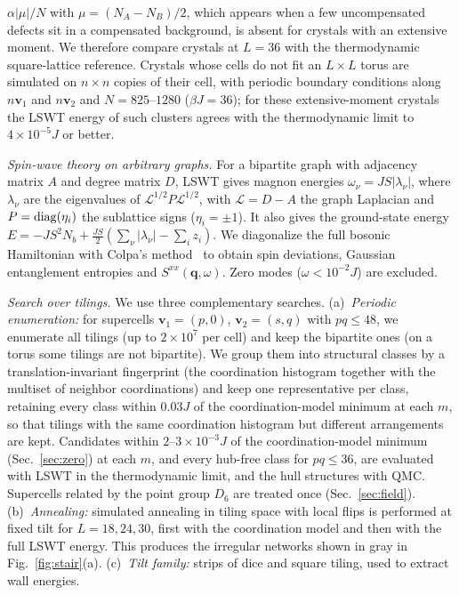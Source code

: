 \documentclass[prb,twocolumn,amsmath,amssymb,floatfix]{revtex4-2}
\begin{document}
$\alpha|\mu|/N$ with $\mu=(N_A-N_B)/2$, which appears when a few uncompensated defects sit in a compensated background, is absent for crystals with an extensive moment. We therefore compare crystals at $L=36$ with the thermodynamic square-lattice reference. Crystals whose cells do not fit an $L\times L$ torus are simulated on $n\times n$ copies of their cell, with periodic boundary conditions along $n\mathbf v_1$ and $n\mathbf v_2$ and $N=825$--$1280$ ($\beta J=36$); for these extensive-moment crystals the LSWT energy of such clusters agrees with the thermodynamic limit to $4\times10^{-5}J$ or better.

\emph{Spin-wave theory on arbitrary graphs.} For a bipartite graph with adjacency matrix $A$ and degree matrix $D$, LSWT gives magnon energies $\omega_\nu=JS|\lambda_\nu|$, where $\lambda_\nu$ are the eigenvalues of $\mathcal L^{1/2}P\mathcal L^{1/2}$, with $\mathcal L=D-A$ the graph Laplacian and $P={\rm diag}(\eta_i)$ the sublattice signs ($\eta_i=\pm1$). It also gives the ground-state energy $E=-JS^2N_b+\frac{JS}2(\sum_\nu|\lambda_\nu|-\sum_iz_i)$. We diagonalize the full bosonic Hamiltonian with Colpa's method~\cite{Colpa1978} to obtain spin deviations, Gaussian entanglement entropies and $S^{xx}(\mathbf q,\omega)$. Zero modes ($\omega<10^{-2}J$) are excluded.

\emph{Search over tilings.} We use three complementary searches. (a)~\emph{Periodic enumeration:} for supercells $\mathbf v_1=(p,0)$, $\mathbf v_2=(s,q)$ with $pq\le48$, we enumerate all tilings (up to $2\times10^7$ per cell) and keep the bipartite ones (on a torus some tilings are not bipartite). We group them into structural classes by a translation-invariant fingerprint (the coordination histogram together with the multiset of neighbor coordinations) and keep one representative per class, retaining every class within $0.03J$ of the coordination-model minimum at each $m$, so that tilings with the same coordination histogram but different arrangements are kept. Candidates within $2$--$3\times10^{-3}J$ of the coordination-model minimum (Sec.~\ref{sec:zero}) at each $m$, and every hub-free class for $pq\le36$, are evaluated with LSWT in the thermodynamic limit, and the hull structures with QMC. Supercells related by the point group $D_6$ are treated once (Sec.~\ref{sec:field}). (b)~\emph{Annealing:} simulated annealing in tiling space with local flips is performed at fixed tilt for $L=18,24,30$, first with the coordination model and then with the full LSWT energy. This produces the irregular networks shown in gray in Fig.~\ref{fig:stair}(a). (c)~\emph{Tilt family:} strips of dice and square tiling, used to extract wall energies.
\end{document}
